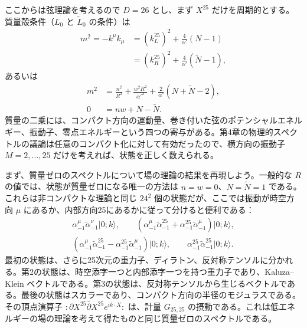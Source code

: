 \label{sec:8.3}

ここからは弦理論を考えるので $D=26$ とし、まず $X^{25}$ だけを周期的とする。質量殻条件（$L_0$ と $\widetilde L_0$ の条件）は
\begin{equation}
\begin{aligned}
m^2=-k^\mu k_\mu&=(k_L^{25})^2+\frac4{\alpha'}(N-1)\\
&=(k_R^{25})^2+\frac4{\alpha'}(\widetilde N-1),
\end{aligned}
\tag{8.3.1}\label{eq:8.3.1}
\end{equation}
あるいは
\begin{align}
m^2&=\frac{n^2}{R^2}+\frac{w^2R^2}{\alpha'^2}
+\frac2{\alpha'}(N+\widetilde N-2),
\tag{8.3.2a}\label{eq:8.3.2a}\\
0&=nw+N-\widetilde N.
\tag{8.3.2b}\label{eq:8.3.2b}
\end{align}
質量の二乗には、コンパクト方向の運動量、巻き付いた弦のポテンシャルエネルギー、振動子、零点エネルギーという四つの寄与がある。第4章の物理的スペクトルの議論は任意のコンパクト化に対して有効だったので、横方向の振動子 $M=2,\ldots,25$ だけを考えれば、状態を正しく数えられる。

まず、質量ゼロのスペクトルについて場の理論の結果を再現しよう。一般的な $R$ の値では、状態が質量ゼロになる唯一の方法は $n=w=0$、$N=\widetilde N=1$ である。これらは非コンパクトな理論と同じ $24^2$ 個の状態だが、ここでは振動が時空方向 $\mu$ にあるか、内部方向25にあるかに従って分けると便利である：
\begin{equation}
\begin{gathered}
\alpha_{-1}^\mu\widetilde\alpha_{-1}^\nu\lvert0;k\rangle,
\qquad (\alpha_{-1}^\mu\widetilde\alpha_{-1}^{25}+\alpha_{-1}^{25}\widetilde\alpha_{-1}^\mu)\lvert0;k\rangle,\\
(\alpha_{-1}^\mu\widetilde\alpha_{-1}^{25}-\alpha_{-1}^{25}\widetilde\alpha_{-1}^\mu)\lvert0;k\rangle,
\qquad\alpha_{-1}^{25}\widetilde\alpha_{-1}^{25}\lvert0;k\rangle.
\end{gathered}
\tag{8.3.3}\label{eq:8.3.3}
\end{equation}
最初の状態は、さらに25次元の重力子、ディラトン、反対称テンソルに分かれる。第2の状態は、時空添字一つと内部添字一つを持つ重力子であり、Kaluza--Klein ベクトルである。第3の状態は、反対称テンソルから生じるベクトルである。最後の状態はスカラーであり、コンパクト方向の半径のモジュラスである。その頂点演算子 $:\partial X^{25}\bar\partial X^{25}e^{ik\cdot X}:$ は、計量 $G_{25,25}$ の摂動である。これは低エネルギーの場の理論を考えて得たものと同じ質量ゼロのスペクトルである。

